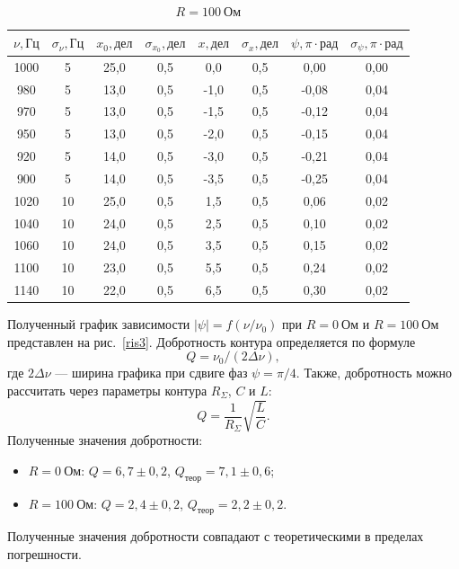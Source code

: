 \documentclass[a4paper, 12pt]{article}
\begin{document}
\begin{table}[h!]
\begin{center}
\begin{tabular}{|c|c|c|c|c|c|c|c|}
\hline
$\nu, Гц$ & $\sigma_{\nu}, Гц$ & $x_0, дел$ & $\sigma_{x_0}, дел$ & $x, дел$ & $\sigma_x, дел$ & $\psi, \pi \cdot рад$ & $\sigma_{\psi}, \pi \cdot рад$ \\ \hline
1000 & 5  & 25,0 & 0,5 & 0,0  & 0,5 & 0,00  & 0,00  \\ \hline
980  & 5  & 13,0 & 0,5 & -1,0 & 0,5 & -0,08 & 0,04 \\ \hline
970  & 5  & 13,0 & 0,5 & -1,5 & 0,5 & -0,12 & 0,04 \\ \hline
950  & 5  & 13,0 & 0,5 & -2,0 & 0,5 & -0,15 & 0,04 \\ \hline
920  & 5  & 14,0 & 0,5 & -3,0 & 0,5 & -0,21 & 0,04 \\ \hline
900  & 5  & 14,0 & 0,5 & -3,5 & 0,5 & -0,25 & 0,04 \\ \hline
1020 & 10 & 25,0 & 0,5 & 1,5  & 0,5 & 0,06  & 0,02  \\ \hline
1040 & 10 & 24,0 & 0,5 & 2,5  & 0,5 & 0,10  & 0,02  \\ \hline
1060 & 10 & 24,0 & 0,5 & 3,5  & 0,5 & 0,15  & 0,02  \\ \hline
1100 & 10 & 23,0 & 0,5 & 5,5  & 0,5 & 0,24  & 0,02  \\ \hline
1140 & 10 & 22,0 & 0,5 & 6,5  & 0,5 & 0,30  & 0,02  \\ \hline
\end{tabular}
\end{center}
\caption{$R = 100~Ом$}
\label{tab4}
\end{table}

Полученный график зависимости $|\psi| = f(\nu/\nu_0)$ при $R = 0~Ом$ и $R = 100~Ом$ представлен на рис.~\ref{ris3}. Добротность контура определяется по формуле $$Q = \nu_0/(2\Delta\nu),$$ где $2\Delta\nu$ --- ширина графика при сдвиге фаз $\psi = \pi/4$. Также, добротность можно рассчитать через параметры контура $R_{\Sigma}$, $C$ и $L$: $$Q = \frac{1}{R_{\Sigma}}\sqrt{\frac{L}{C}}.$$ Полученные значения добротности:
\begin{itemize}
\item $R = 0~Ом$: $Q = 6,7\pm0,2$, $Q_{теор} = 7,1\pm0,6$;
\item $R = 100~Ом$: $Q = 2,4\pm0,2$, $Q_{теор} = 2,2\pm0,2$.
\end{itemize}
Полученные значения добротности совпадают с теоретическими в пределах погрешности.
\end{document}
